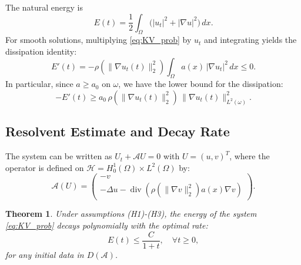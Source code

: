 \documentclass[11pt,reqno]{amsart}
\newtheorem{theorem}{Theorem}[section]
\theoremstyle{remark}
\begin{document}
The natural energy is
\[
E(t)=\frac12\int_\Omega\bigl(|u_t|^2+|\nabla u|^2\bigr)\,dx.
\]
For smooth solutions, multiplying \eqref{eq:KV_prob} by $u_t$ and integrating yields the dissipation identity:
\begin{equation}\label{eq:diss_KV}
E'(t)=-\rho(\|\nabla u_t(t)\|_2^2)\int_\Omega a(x)\,|\nabla u_t|^2\,dx \le 0.
\end{equation}
In particular, since $a\ge a_0$ on $\omega$, we have the lower bound for the dissipation:
\begin{equation}\label{eq:diss_KV_local}
-E'(t)\ge a_0\,\rho(\|\nabla u_t(t)\|_2^2)\,\|\nabla u_t(t)\|_{L^2(\omega)}^2.
\end{equation}

\subsection{Resolvent Estimate and Decay Rate}

The system can be written as $U_t + \mathcal{A}U = 0$ with $U=(u,v)^T$, where the operator is defined on $\mathcal{H} = H_0^1(\Omega) \times L^2(\Omega)$ by:
\[
    \mathcal{A}(U) = \begin{pmatrix} -v \\ -\Delta u - \operatorname{div}(\rho(\|\nabla v\|_2^2) a(x) \nabla v) \end{pmatrix}.
\]

\begin{theorem}
    Under assumptions (H1)-(H3), the energy of the system \eqref{eq:KV_prob} decays polynomially with the optimal rate:
    \begin{equation}
        E(t) \le \frac{C}{1+t}, \quad \forall t \ge 0,
    \end{equation}
    for any initial data in $D(\mathcal{A})$.
\end{theorem}
\end{document}
